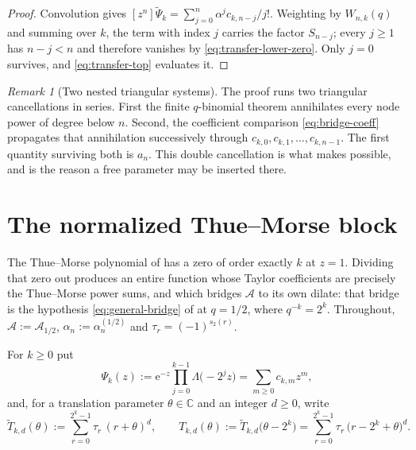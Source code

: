 \documentclass[11pt,oneside,openany]{book}
\theoremstyle{definition}
\theoremstyle{remark}
\newtheorem{remark}[remark]{Remark}
\newcommand{\C}{\mathbb C}
\newcommand{\e}{\mathrm e}
\newcommand{\defeq}{\mathrel{:=}}
\begin{document}
\begin{proof}
Convolution gives $[z^n]\widetilde\Psi_k=\sum_{j=0}^{n}\alpha^jc_{k,n-j}/j!$.  Weighting by $W_{n,k}(q)$ and summing over $k$, the term with index $j$ carries the factor $S_{n-j}$; every $j\ge1$ has $n-j<n$ and therefore vanishes by \eqref{eq:transfer-lower-zero}.  Only $j=0$ survives, and \eqref{eq:transfer-top} evaluates it.
\end{proof}

\begin{remark}[Two nested triangular systems]\label{rem:double-cancellation}
The proof runs two triangular cancellations in series.  First the finite $q$-binomial theorem annihilates every node power of degree below $n$.  Second, the coefficient comparison \eqref{eq:bridge-coeff} propagates that annihilation successively through $c_{k,0},c_{k,1},\ldots,c_{k,n-1}$.  The first quantity surviving both is $a_n$.  This double cancellation is what makes  possible, and  is the reason a free parameter may be inserted there.
\end{remark}

\section{The normalized Thue--Morse block}

The Thue--Morse polynomial of  has a zero of order exactly
$k$ at $z=1$.  Dividing that zero out produces an entire function whose Taylor
coefficients are precisely the Thue--Morse power sums, and which bridges $\mathcal A$ to
its own dilate: that bridge is the hypothesis \eqref{eq:general-bridge} of
 at $q=1/2$, where $q^{-k}=2^k$.  Throughout,
$\mathcal A\defeq\mathcal A_{1/2}$, $\alpha_n\defeq\alpha^{(1/2)}_n$ and
$\tau_r=(-1)^{s_2(r)}$.

For $k\ge0$ put
\begin{equation}\label{eq:Psi-k-definition}
 \Psi_k(z)\defeq\e^{-z}\prod_{j=0}^{k-1}\Lambda\bigl(-2^jz\bigr)
 =\sum_{m\ge0}c_{k,m}z^m,
\end{equation}
and, for a translation parameter $\theta\in\C$ and an integer $d\ge0$, write
\begin{equation}\label{eq:thue-morse-power-sums}
 \widetilde T_{k,d}(\theta)\defeq\sum_{r=0}^{2^k-1}\tau_r\,(r+\theta)^d,
 \qquad
 T_{k,d}(\theta)\defeq\widetilde T_{k,d}\bigl(\theta-2^k\bigr)
 =\sum_{r=0}^{2^k-1}\tau_r\,\bigl(r-2^k+\theta\bigr)^d .
\end{equation}
\end{document}
